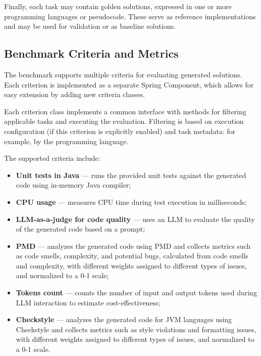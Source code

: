 Finally, each task may contain golden solutions, expressed in one or more programming languages or pseudocode.
These serve as reference implementations and may be used for validation or as baseline solutions.

\subsection{Benchmark Criteria and Metrics}

The benchmark supports multiple criteria for evaluating generated solutions.
Each criterion is implemented as a separate Spring Component, which allows for easy extension by adding new criteria classes.

Each criterion class implements a common interface with methods for filtering applicable tasks and executing the evaluation.
Filtering is based on execution configuration (if this criterion is explicitly enabled) and task metadata: for example, by the programming language.

The supported criteria include:
\begin{itemize}
    \item \textbf{Unit tests in Java} --- runs the provided unit tests against the generated code using in-memory Java compiler;
    \item \textbf{CPU usage} --- measures CPU time during test execution in milliseconds;
    \item \textbf{LLM-as-a-judge for code quality} --- uses an LLM to evaluate the quality of the generated code based on a prompt;
    \item \textbf{PMD} --- analyzes the generated code using PMD and collects metrics such as code smells, complexity, and potential bugs, calculated from code smells and complexity, with different weights assigned to different types of issues, and normalized to a 0-1 scale;
    \item \textbf{Tokens count} --- counts the number of input and output tokens used during LLM interaction to estimate cost-effectiveness;
    \item \textbf{Checkstyle} --- analyzes the generated code for JVM languages using Checkstyle and collects metrics such as style violations and formatting issues, with different weights assigned to different types of issues, and normalized to a 0-1 scale.
\end{itemize}

